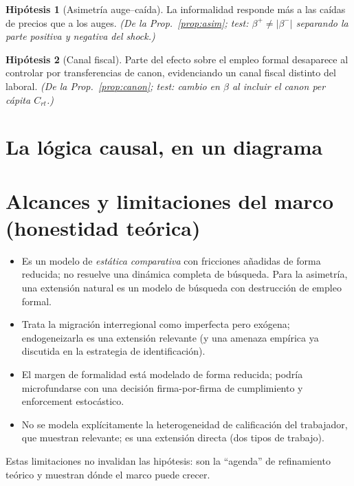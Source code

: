 \documentclass[11pt]{article}
\theoremstyle{definition}
\newtheorem{hipotesis}{Hipótesis}
\theoremstyle{plain}
\begin{document}
\begin{hipotesis}[Asimetría auge--caída]\label{h:asim}
La informalidad responde más a las caídas de precios que a los auges. \emph{(De la
Prop.~\ref{prop:asim}; test: $\beta^{+}\neq|\beta^{-}|$ separando la parte positiva y negativa
del shock.)}
\end{hipotesis}

\begin{hipotesis}[Canal fiscal]\label{h:canon}
Parte del efecto sobre el empleo formal desaparece al controlar por transferencias de canon,
evidenciando un canal fiscal distinto del laboral. \emph{(De la Prop.~\ref{prop:canon}; test:
cambio en $\beta$ al incluir el canon per cápita $C_{rt}$.)}
\end{hipotesis}

\section{La lógica causal, en un diagrama}
\begin{center}
\end{center}

\section{Alcances y limitaciones del marco (honestidad teórica)}
\begin{itemize}[leftmargin=1.6em, itemsep=1pt]
  \item Es un modelo de \emph{estática comparativa} con fricciones añadidas de forma reducida;
  no resuelve una dinámica completa de búsqueda. Para la asimetría, una extensión natural es un
  modelo de búsqueda con destrucción de empleo formal.
  \item Trata la migración interregional como imperfecta pero exógena; endogeneizarla es una
  extensión relevante (y una amenaza empírica ya discutida en la estrategia de identificación).
  \item El margen de formalidad está modelado de forma reducida; podría microfundarse con una
  decisión firma-por-firma de cumplimiento y enforcement estocástico.
  \item No se modela explícitamente la heterogeneidad de calificación del trabajador, que
  \citet{benguria2024} muestran relevante; es una extensión directa (dos tipos de trabajo).
\end{itemize}
Estas limitaciones no invalidan las hipótesis: son la ``agenda'' de refinamiento teórico y
muestran dónde el marco puede crecer.
\end{document}
